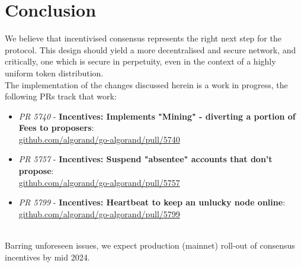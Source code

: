 \documentclass[11pt,a4paper]{article}
\begin{document}
\pagebreak

\section{Conclusion}
We believe that incentivised consensus represents the right next step for the protocol. This design should yield a more 
decentralised and secure network, and critically, one which is secure in perpetuity, even in the context of a highly 
uniform token distribution. \\ 

The implementation of the changes discussed herein is a work in progress, the following PRs track that work:


\begin{itemize}
    \item \emph{PR 5740} - \textbf{Incentives: Implements "Mining" - diverting a portion of Fees to proposers}:\\
          \href{https://github.com/algorand/go-algorand/pull/5740}{github.com/algorand/go-algorand/pull/5740} \\
    \item \emph{PR 5757} - \textbf{Incentives: Suspend "absentee" accounts that don't propose}:\\
          \href{https://github.com/algorand/go-algorand/pull/5757}{github.com/algorand/go-algorand/pull/5757} \\
    \item \emph{PR 5799} - \textbf{Incentives: Heartbeat to keep an unlucky node online}:\\
          \href{https://github.com/algorand/go-algorand/pull/5799}{github.com/algorand/go-algorand/pull/5799}
\end{itemize} \mbox{} \\ 


Barring unforeseen issues, we expect production (mainnet) roll-out of consensus incentives by mid 2024.

\pagebreak

\printglossaries

\pagebreak
\end{document}

